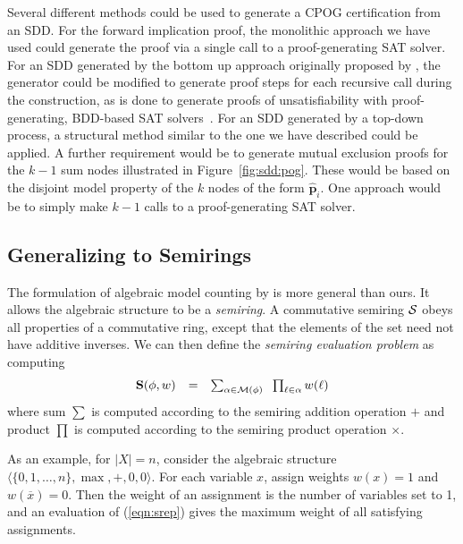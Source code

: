\documentclass[twoside,11pt]{article}
\newcommand{\obar}[1]{\overline{#1}}
\newcommand{\lit}{\ell}
\newcommand{\semiring}{{\cal S}}
\newcommand{\srep}{\textbf{S}}
\newcommand{\radd}{+}
\newcommand{\rmul}{\times}
\newcommand{\modelset}{{\cal M}}
\newcommand{\makenode}[1]{\mathbf{#1}}
\newcommand{\nodep}{\makenode{p}}
\begin{document}
Several different methods could be used to generate a CPOG
certification from an SDD\@.  For the forward implication proof, the
monolithic approach we have used could generate the proof via a single
call to a proof-generating SAT solver.  For an SDD generated by the
bottom up approach originally proposed by ,
the generator could be modified to generate proof steps for each
recursive call during the construction, as is done to generate proofs
of unsatisfiability with proof-generating, BDD-based SAT
solvers~\cite{Jussila:2006,ebddres,bryant:fmcad:2022,bryant:tocl:2023}.
For an SDD generated by a top-down process, a structural method
similar to the one we have described could be applied.  A further
requirement would be to generate mutual exclusion proofs for the $k-1$
sum nodes illustrated in Figure~\ref{fig:sdd:pog}.  These would be
based on the disjoint model property of the $k$ nodes of the form
$\hat{\nodep}_i$.  One approach would be to simply make $k-1$ calls to a
proof-generating SAT solver.

\subsection{Generalizing to Semirings}
\label{sect:semiring}

The formulation of algebraic model
counting by  is more general than ours.  It allows
the algebraic structure to be a \emph{semiring}.  A commutative
semiring $\semiring$ obeys all properties of a commutative ring, except that the
elements of the set need not have additive inverses.
We can then define the {\em semiring evaluation problem} as computing
  \begin{equation}
    \begin{array}{rcl}
    \srep(\phi, w) & = & \sum_{\alpha \in \modelset(\phi)} \;\; \prod_{\lit \in \alpha} w(\ell) \label{eqn:srep}
    \end{array}
  \end{equation}
  where sum $\sum$ is computed according to the semiring addition operation $\radd$ and product $\prod$
  is computed according to the semiring product operation $\rmul$.

  As an example, for $|X| = n$, consider the algebraic structure
  $\langle \{0, 1, \ldots, n\}, \max, +, 0, 0 \rangle$.
For each variable $x$, assign weights
$w(x) = 1$ and $w(\obar{x}) = 0$.  Then the
weight of an assignment is the number of variables set to 1, and an
evaluation of (\ref{eqn:srep}) gives the maximum weight of all
satisfying assignments.
\end{document}
